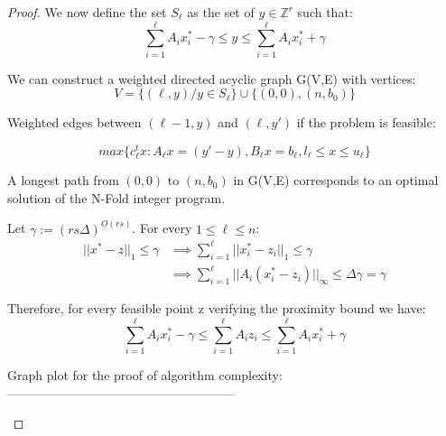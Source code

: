 \begin{proof}

    
We now define the set $S_\ell$ as the set of $y \in \mathbb{Z}^r$ such that:
\begin{equation*}
\sum_{i=1}^\ell A_ix_i^* - \gamma \leq y \leq \sum_{i=1}^\ell A_ix_i^* + \gamma 
\end{equation*}
        
        
We can construct a weighted directed acyclic graph G(V,E) with vertices:
\begin{equation*}
    V = \{(\ell,y) / y \in S_\ell\} \cup \{ (0,0), (n,b_0) \}
\end{equation*}
        
Weighted edges between $(\ell-1,y)$ and $(\ell,y')$ if the problem is feasible:
        
\begin{equation*}
    max\{c_\ell^tx: A_\ell x = (y'-y), B_\ell x = b_\ell, l_\ell \leq x \leq u_\ell \}
\end{equation*}
        
A longest path from $(0,0)$ to $(n,b_0)$ in G(V,E) corresponds to an optimal solution of the N-Fold integer program.

Let $\gamma := (rs\Delta)^{O(rs)}$. For every $1 \leq \ell \leq n$:
\begin{align*}
    ||x^* - z||_1 \leq \gamma 
    & \implies \sum_{i=1}^\ell ||x_i^* - z_i||_1 \leq \gamma\\ 
    & \implies \sum_{i=1}^\ell ||A_i(x_i^* - z_i)||_\infty \leq \Delta \gamma = \gamma
\end{align*}

Therefore, for every feasible point z verifying the proximity bound we have:
\begin{equation*}
    \sum_{i=1}^\ell A_ix_i^* - \gamma \leq \sum_{i=1}^\ell A_iz_i \leq \sum_{i=1}^\ell A_ix_i^* + \gamma 
\end{equation*}

Graph plot for the proof of algorithm complexity:
------------------------------------------------------
    \begin{center}
    \begin{tikzpicture}[
            > = stealth, %
            shorten > = 1pt, %
            auto,
            node distance = 3cm, %
            semithick %
        ]


\end{tikzpicture}
\end{center}
\end{proof}
